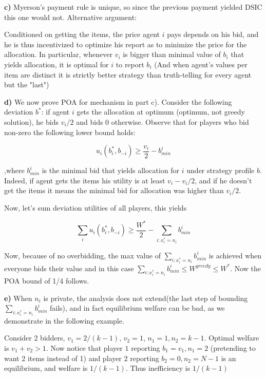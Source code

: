 \textbf{c)} Myerson's payment rule is unique, so since the previous payment yielded DSIC this one would not. Alternative argument:

Conditioned on getting the items, the price agent $i$ pays depends on his bid, and he is thus incentivized to optimize his report as to minimize the price for the allocation. In particular, whenever $v_i$ is bigger than minimal value of $b_i$ that yields allocation, it is optimal for $i$ to report $b_i$ (And when agent's values per item are distinct it is strictly better strategy than truth-telling for every agent but the "last")

\textbf{d)} We now prove POA for mechanism in part c). Consider the following deviation $b^*$: if agent $i$ gets the allocation at optimum (optimum, not greedy solution), he bids $v_i/2$ and bids 0 otherwise. Observe that for players who bid non-zero the following lower bound holds:

$$
u_i(b^*_i,b_{-i})\geq \frac{v_i}{2}-b^i_{min}
$$

,where $b^i_{min}$ is the minimal bid that yields allocation for $i$ under strategy profile $b$. Indeed, if agent gets the items his utility is at least $v_i-v_i/2$, and if he doesn't get the items it means the minimal bid for allocation was higher than $v_i/2$.

Now, let's sum deviation utilities of all players, this yields

$$
\sum_i u_i(b_i^*,b_{-i})\geq \frac{W^*}{2}-\sum_{i: x^*_i=n_i} b^i_{min}
$$

Now, because of no overbidding, the max value of $\sum_{i: x^*_i=n_i} b^i_{min}$ is achieved when everyone bids their value and in this case $\sum_{i: x^*_i=n_i} b^i_{min}\leq W^{greedy}\leq W^*$. Now the POA bound of 1/4 follows.

\textbf{e)} When $n_i$ is private, the analysis does not extend(the last step of bounding  $\sum_{i: x^*_i=n_i} b^i_{min}$ fails), and in fact equilibrium welfare can be bad, as we demonstrate in the following example.

Consider 2 bidders, $v_1=2/(k-1)$, $v_2=1$, $n_1=1,n_2=k-1$. Optimal welfare is $v_1+v_2>1$. Now notice that player $1$ reporting $b_1=v_1,n_1=2$ (pretending to want 2 items instead of 1) and player $2$ reporting $b_2=0, n_2=N-1$ is an equilibrium, and welfare is $1/(k-1)$. Thus inefficiency is $1/(k-1)$